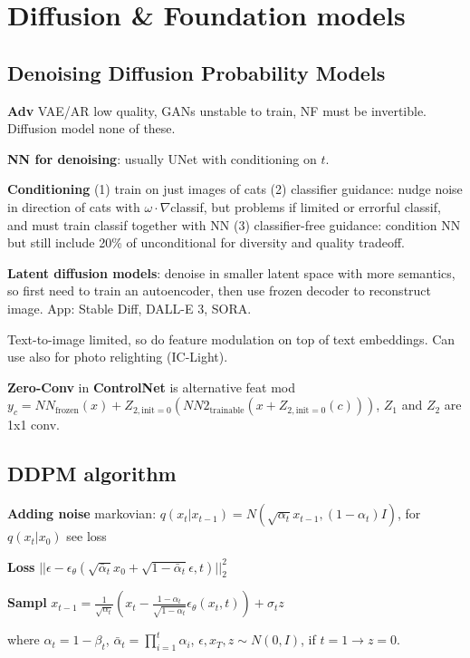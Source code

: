 \section{Diffusion \& Foundation models}

\subsection*{Denoising Diffusion Probability Models}

\textbf{Adv} VAE/AR low quality, GANs unstable to train, NF must be invertible. Diffusion model none of these.

\textbf{NN for denoising}: usually UNet with conditioning on $t$.

\textbf{Conditioning} (1) train on just images of cats (2) classifier guidance: nudge noise in direction of cats with $\omega\cdot\nabla$classif, but problems if limited or errorful classif, and must train classif together with NN (3) classifier-free guidance: condition NN but still include 20\% of unconditional for diversity and quality tradeoff.

\textbf{Latent diffusion models}: denoise in smaller latent space with more semantics, so first need to train an autoencoder, then use frozen decoder to reconstruct image. App: Stable Diff, DALL-E 3, SORA.

Text-to-image limited, so do feature modulation on top of text embeddings. Can use also for photo relighting (IC-Light).

\textbf{Zero-Conv} in \textbf{ControlNet} is alternative feat mod $y_c = NN_{\text{frozen}}(x) + Z_{2, \text{init}=0}(NN2_{\text{trainable}}(x + Z_{2, \text{init}=0}(c)))$, $Z_1$ and $Z_2$ are 1x1 conv.

\subsection*{DDPM algorithm}

\textbf{Adding noise} markovian: $q(x_t|x_{t-1})=N(\sqrt{\alpha_t}x_{t-1}, (1-\alpha_t)I)$, for $q(x_t|x_0)$ see loss

\textbf{Loss} $||\epsilon - \epsilon_\theta(\sqrt{\bar{\alpha}_t} x_0 + \sqrt{1 - \bar{\alpha}_t} \epsilon, t)||_2^2$

\textbf{Sampl} $x_{t-1} = \frac{1}{\sqrt{\alpha_t}}(x_t - \frac{1-\alpha_t}{\sqrt{1-\bar{\alpha}_t}}\epsilon_\theta(x_t, t)) + \sigma_t z$

where $\alpha_t = 1-\beta_t$, $\bar{\alpha}_t = \prod_{i=1}^{t} \alpha_i$, $\epsilon, x_T, z \sim N(0,I)$, if $t=1 \rightarrow z=0$.


